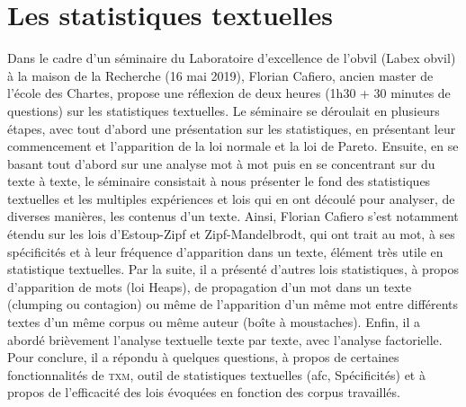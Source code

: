 \section{Les statistiques textuelles}
Dans le cadre d'un séminaire du Laboratoire d'excellence de l'\acrlong{obvil} (Labex \acrshort{obvil}) à la maison de la Recherche (16 mai 2019), Florian Cafiero, ancien master de l'école des Chartes, propose une réflexion de deux heures (1h30 + 30 minutes de questions) sur les statistiques textuelles. Le séminaire se déroulait en plusieurs étapes, avec tout d'abord une présentation sur les statistiques, en présentant leur commencement et l'apparition de la loi normale et la loi de Pareto. Ensuite, en se basant tout d'abord sur une analyse mot à mot puis en se concentrant sur du texte à texte, le séminaire consistait à nous présenter le fond des statistiques textuelles et les multiples expériences et lois qui en ont découlé pour analyser, de diverses manières, les contenus d'un texte. Ainsi, Florian Cafiero s'est notamment étendu sur les lois d'Estoup-Zipf et Zipf-Mandelbrodt, qui ont trait au mot, à ses spécificités et à leur fréquence d'apparition dans un texte, élément très utile en statistique textuelles. Par la suite, il a présenté d'autres lois statistiques, à propos d'apparition de mots (loi Heaps), de propagation d'un mot dans un texte (\og clumping \fg{} ou contagion) ou même de l'apparition d'un même mot entre différents textes d'un même corpus ou même auteur (boîte à moustaches). Enfin, il a abordé brièvement l'analyse textuelle texte par texte, avec l'analyse factorielle. Pour conclure, il a répondu à quelques questions, à propos de certaines fonctionnalités de \textsc{txm}, outil de statistiques textuelles (\acrshort{afc}, Spécificités) et à propos de l'efficacité des lois évoquées en fonction des corpus travaillés.

